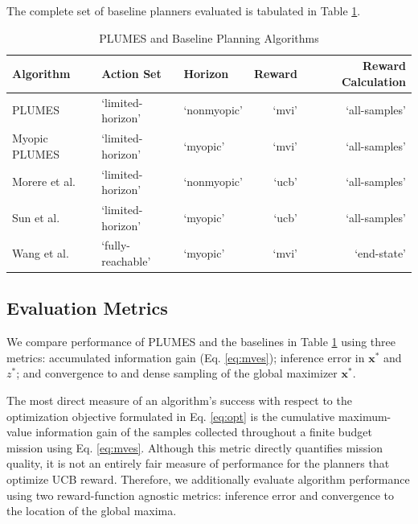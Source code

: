 \documentclass{styles/svproc}
\newcommand{\x}{\mathbf{x}}
\begin{document}

The complete set of baseline planners evaluated is tabulated in Table \ref{tab:baselines}. 
\begin{table}
\caption{PLUMES and Baseline Planning Algorithms}
\label{tab:baselines}
\begin{center}
\noindent
\begin{tabular}{l | llrr} Algorithm & Action Set & Horizon & Reward & Reward Calculation\\[2pt]
\hline
\hline
PLUMES  & `limited-horizon' & `nonmyopic' & `mvi' & `all-samples' \\
Myopic PLUMES  & `limited-horizon' & `myopic' & `mvi' & `all-samples' \\
Morere et al. \cite{Marchant2014a}  & `limited-horizon' & `nonmyopic' & `ucb' & `all-samples' \\
Sun et al. \cite{Sun2017} & `limited-horizon' & `myopic' & `ucb' & `all-samples' \\
Wang et al. \cite{wang2017max}  & `fully-reachable' & `myopic' & `mvi' & `end-state' \\

\hline
\end{tabular}
\end{center}
\end{table}

\subsection{Evaluation Metrics}
\label{sec:metrics}
We compare performance of PLUMES and the baselines in Table \ref{tab:baselines} using three metrics: accumulated information gain (Eq. \ref{eq:mves}); inference error in $\x^*$ and $z^*$; and convergence to and dense sampling of the global maximizer $\x^*$. 

The most direct measure of an algorithm's success with respect to the optimization objective formulated in Eq. \ref{eq:opt} is the cumulative maximum-value information gain of the samples collected throughout a finite budget mission using Eq. \ref{eq:mves}. Although this metric directly quantifies mission quality, it is not an entirely fair measure of performance for the planners that optimize UCB reward. Therefore, we additionally evaluate algorithm performance using two reward-function agnostic metrics: inference error and convergence to the location of the global maxima.
\end{document}

